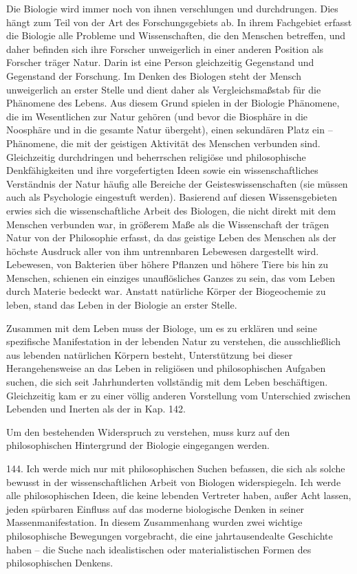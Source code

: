 \documentclass[11pt,a4paper]{book}
\begin{document}
Die Biologie wird immer noch von ihnen verschlungen und durchdrungen. Dies hängt zum Teil von der Art des Forschungsgebiets ab. In ihrem Fachgebiet erfasst die Biologie alle Probleme und Wissenschaften, die den Menschen betreffen, und daher befinden sich ihre Forscher unweigerlich in einer anderen Position als Forscher träger Natur. Darin ist eine Person gleichzeitig Gegenstand und Gegenstand der Forschung. Im Denken des Biologen steht der Mensch unweigerlich an erster Stelle und dient daher als Vergleichsmaßstab für die Phänomene des Lebens. Aus diesem Grund spielen in der Biologie Phänomene, die im Wesentlichen zur Natur gehören (und bevor die Biosphäre in die Noosphäre und in die gesamte Natur übergeht), einen sekundären Platz ein -- Phänomene, die mit der geistigen Aktivität des Menschen verbunden sind. Gleichzeitig durchdringen und beherrschen religiöse und philosophische Denkfähigkeiten und ihre vorgefertigten Ideen sowie ein wissenschaftliches Verständnis der Natur häufig alle Bereiche der Geisteswissenschaften (sie müssen auch als Psychologie eingestuft werden). Basierend auf diesen Wissensgebieten erwies sich die wissenschaftliche Arbeit des Biologen, die nicht direkt mit dem Menschen verbunden war, in größerem Maße als die Wissenschaft der trägen Natur von der Philosophie erfasst, da das geistige Leben des Menschen als der höchste Ausdruck aller von ihm untrennbaren Lebewesen dargestellt wird. Lebewesen, von Bakterien über höhere Pflanzen und höhere Tiere bis hin zu Menschen, schienen ein einziges unauflösliches Ganzes zu sein, das vom Leben durch Materie bedeckt war. Anstatt natürliche Körper der Biogeochemie zu leben, stand das Leben in der Biologie an erster Stelle.



Zusammen mit dem Leben muss der Biologe, um es zu erklären und seine spezifische Manifestation in der lebenden Natur zu verstehen, die ausschließlich aus lebenden natürlichen Körpern besteht, Unterstützung bei dieser Herangehensweise an das Leben in religiösen und philosophischen Aufgaben suchen, die sich seit Jahrhunderten vollständig mit dem Leben beschäftigen. Gleichzeitig kam er zu einer völlig anderen Vorstellung vom Unterschied zwischen Lebenden und Inerten als der in Kap. 142.



Um den bestehenden Widerspruch zu verstehen, muss kurz auf den philosophischen Hintergrund der Biologie eingegangen werden.



144. Ich werde mich nur mit philosophischen Suchen befassen, die sich als solche bewusst in der wissenschaftlichen Arbeit von Biologen widerspiegeln. Ich werde alle philosophischen Ideen, die keine lebenden Vertreter haben, außer Acht lassen, jeden spürbaren Einfluss auf das moderne biologische Denken in seiner Massenmanifestation. In diesem Zusammenhang wurden zwei wichtige philosophische Bewegungen vorgebracht, die eine jahrtausendealte Geschichte haben -- die Suche nach idealistischen oder materialistischen Formen des philosophischen Denkens.
\end{document}

